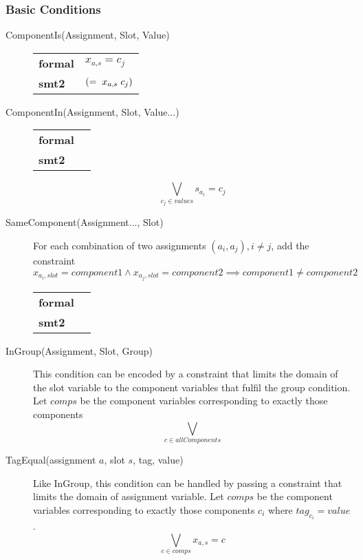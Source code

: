 \newcommand{\s}{\hspace{0.1cm}}

\subsubsection{Basic Conditions}

\begin{description}
\item[ComponentIs(Assignment, Slot, Value)]

\begin{tabular}{l l}
	\textbf{formal} & $ x_{a\text{,} s} = c_j $ \\
	\textbf{smt2} & $ (= \s x_{a\text{,}s} \s c_j) $
\end{tabular}


\item[ComponentIn(Assignment, Slot, Value...)]	

\begin{tabular}{l l}
	\textbf{formal} & \\
	\textbf{smt2} & 
\end{tabular}


$$ \bigvee_{c_j\in values} s_{a_i} = c_j $$



\item[SameComponent(Assignment..., Slot)]
For each combination of two assignments $(a_i, a_j), i\neq j$, add the constraint
$$ x_{a_i, slot} = component1 \wedge x_{a_j, slot} = component2 \implies component1 \neq component2 $$

\begin{tabular}{l l}
	\textbf{formal} & \\
	\textbf{smt2} & 
\end{tabular}

		
\item[InGroup(Assignment, Slot, Group)]
This condition can be encoded by a constraint that limits the domain of the slot variable to the component variables that fulfil the group condition.
Let $comps$ be the component variables corresponding to exactly those components   
$$ \bigvee_{c\in allComponents} $$



\item[TagEqual(assignment $a$, slot $s$, tag, value)]
Like InGroup, this condition can be handled by passing a constraint that limits the domain of assignment variable.
Let $comps$ be the component variables corresponding to exactly those components $c_i$ where $tag_{c_i} = value$.
$$ \bigvee_{c\in comps} x_{a,s} = c$$


\end{description}
